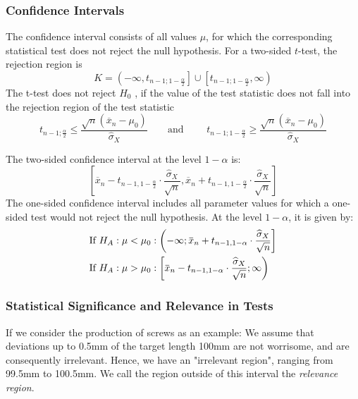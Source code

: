 \documentclass[11pt]{article}
\newcommand*\samplemean[1]{\overline{#1}}
\newcommand{\overbar}[1]{\mkern 1.5mu\overline{\mkern-1.5mu#1\mkern-1.5mu}\mkern 1.5mu}
\begin{document}
\subsubsection{Confidence Intervals}
The confidence interval consists of all values $\mu$, for which the corresponding statistical test does not reject the null hypothesis. For a two-sided $t$-test, the rejection region is
\begin{equation*}
	K = \left( -\infty, t_{n-1; 1-\frac{\alpha}{2}} \right] \cup \left[ t_{n-1; 1- \frac{\alpha}{2}}, \infty \right)
\end{equation*}
The t-test does not reject $H_0$ , if the value of the test statistic does not fall into the rejection region of the test statistic
\begin{equation*}
	t_{n-1; \frac{\alpha}{2}} \leq \frac{\sqrt{n}(\samplemean{x}_n - \mu_0)}{\widehat{\sigma}_X} \qquad	\text{and } \qquad
	t_{n-1; 1 - \frac{\alpha}{2}} \geq \frac{\sqrt{n}(\samplemean{x}_n - \mu_0)}{\widehat{\sigma}_X}
\end{equation*}

\begin{definition}
	The two-sided confidence interval at the level $1-\alpha$ is:
	\begin{equation*}
		\left[ \samplemean{x}_n - t_{n-1,1-\frac{\alpha}{2}}\cdot\frac{\widehat{\sigma}_X}{\sqrt{n}}, \samplemean{x}_n + t_{n-1,1-\frac{\alpha}{2}}\cdot\frac{\widehat{\sigma}_X}{\sqrt{n}} \right]
	\end{equation*}
	The one-sided confidence interval includes all parameter values for which a one-sided test would not reject the null hypothesis. At the level $1 - \alpha$, it is given by:
	\begin{align*}
		\text{If } H_A: \mu < \mu_0 &: \left(- \infty;\overbar{x}_n + t_{n-1,1-\alpha}\cdot \dfrac{\widehat{\sigma}_X}{\sqrt{n}} \right]\\
		\text{If } H_A: \mu > \mu_0 &: \left[\overbar{x}_n - t_{n-1,1-\alpha} \cdot \dfrac{\widehat{\sigma}_X}{\sqrt{n}};\infty \right)
	\end{align*}
\end{definition}

\subsubsection{Statistical Significance and Relevance in Tests}
If we consider the production of screws as an example: We assume that deviations
up to 0.5mm of the target length 100mm are not worrisome, and are consequently
irrelevant. Hence, we have an "irrelevant region", ranging from 99.5mm to 100.5mm.
We call the region outside of this interval the \textit{relevance region}.
\end{document}

